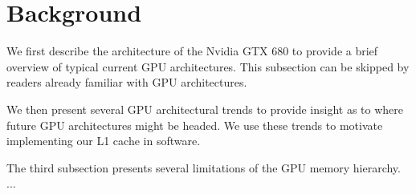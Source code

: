 \section{Background}
We first describe the architecture of the Nvidia  GTX 680 to provide a brief overview of typical current GPU architectures.
This subsection can be skipped by readers already familiar with GPU architectures.

We then present several GPU architectural trends to provide insight as to where future GPU architectures might be headed.
We use these trends to motivate implementing our L1 cache in software.

The third subsection presents several limitations of the GPU memory hierarchy.
...



% 
